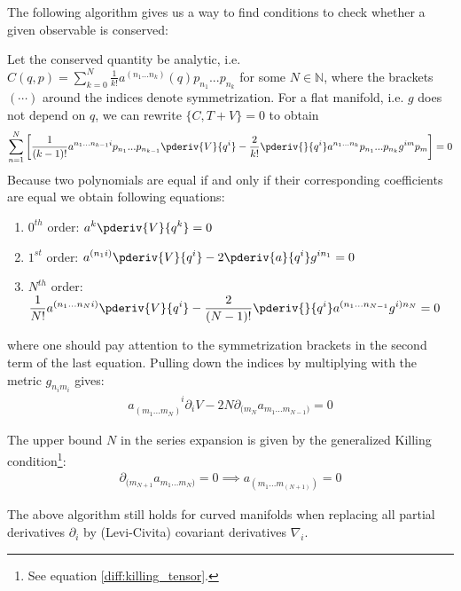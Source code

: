 	The following algorithm gives us a way to find conditions to check whether a given observable is conserved:
	\begin{method}
		Let the conserved quantity be analytic, i.e. $C(q, p) = \sum_{k=0}^N\frac{1}{k!}a^{(n_1...n_k)}(q)p_{n_1}...p_{n_k}$ for some $N\in\mathbb{N}$, where the brackets $(\cdots)$ around the indices denote symmetrization. For a flat manifold, i.e. $g$ does not depend on $q$, we can rewrite $\{C, T+V\} = 0$ to obtain
		\[
			\sum_{n = 1}^N\left[\frac{1}{(k-1)!}a^{n_1...n_{k-1}i}p_{n_1}...p_{n_{k-1}}\pderiv{V}{q^i} - \frac{2}{k!}\pderiv{}{q^i}a^{n_1...n_k}p_{n_1}...p_{n_k}g^{im}p_m\right] = 0
		\]
		Because two polynomials are equal if and only if their corresponding coefficients are equal we obtain following equations:
		\begin{enumerate}
			\item $0^{th}$ order: $\displaystyle a^k\pderiv{V}{q^k} = 0$
			\item $1^{st}$ order: $\displaystyle a^{(n_1i)}\pderiv{V}{q^i} - 2\pderiv{a}{q^i}g^{in_1} = 0$
			\item $N^{th}$ order: $\displaystyle \frac{1}{N!}a^{(n_1...n_Ni)}\pderiv{V}{q^i} - \frac{2}{(N-1)!}\pderiv{}{q^i}a^{(n_1...n_{N-1}}g^{i)n_N} = 0$
		\end{enumerate}
		where one should pay attention to the symmetrization brackets in the second term of the last equation. Pulling down the indices by multiplying with the metric $g_{n_im_i}$ gives:
		\begin{gather}
			a_{(m_1...m_N)}^{\phantom{(m_1...m_N)}i}\partial_iV - 2N\partial_{(m_N}a_{m_1...m_{N-1})} = 0
		\end{gather}
		
		The upper bound $N$ in the series expansion is given by the generalized Killing condition\footnote{See equation \ref{diff:killing_tensor}.}:
		\begin{gather}
			\partial_{(m_{N+1}}a_{m_1...m_N)} = 0\implies a_{(m_1...m_(N+1))} = 0
		\end{gather}
	\end{method}
	\begin{remark}
		The above algorithm still holds for curved manifolds when replacing all partial derivatives $\partial_i$ by (Levi-Civita) covariant derivatives $\nabla_i$.
	\end{remark}
